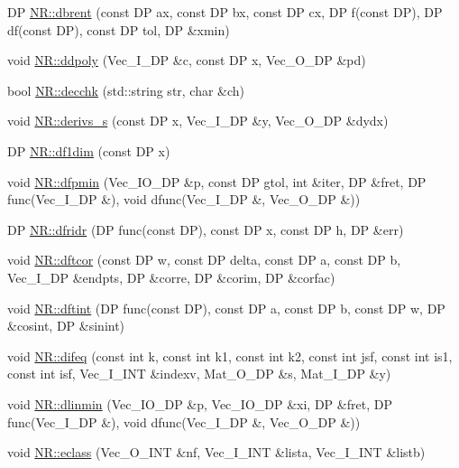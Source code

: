\begin{DoxyCompactItemize}
\item 
DP \mbox{\hyperlink{namespaceNR_af1d68c637282cf655b5c683b052a0b6d}{N\+R\+::dbrent}} (const DP ax, const DP bx, const DP cx, DP f(const DP), DP df(const DP), const DP tol, DP \&xmin)
\item 
void \mbox{\hyperlink{namespaceNR_ad41cff50a7498a881df8034897f4fb51}{N\+R\+::ddpoly}} (Vec\+\_\+\+I\+\_\+\+DP \&c, const DP x, Vec\+\_\+\+O\+\_\+\+DP \&pd)
\item 
bool \mbox{\hyperlink{namespaceNR_a8d6348025222a219a6ed25d9f2d2b3f4}{N\+R\+::decchk}} (std\+::string str, char \&ch)
\item 
void \mbox{\hyperlink{namespaceNR_a42dd648242c5c48df166bfb2b2125d80}{N\+R\+::derivs\+\_\+s}} (const DP x, Vec\+\_\+\+I\+\_\+\+DP \&y, Vec\+\_\+\+O\+\_\+\+DP \&dydx)
\item 
DP \mbox{\hyperlink{namespaceNR_a2df356ad46edbeee385843c4545f3963}{N\+R\+::df1dim}} (const DP x)
\item 
void \mbox{\hyperlink{namespaceNR_a1c51cf1eefec14e2597519a70b6158d6}{N\+R\+::dfpmin}} (Vec\+\_\+\+I\+O\+\_\+\+DP \&p, const DP gtol, int \&iter, DP \&fret, DP func(Vec\+\_\+\+I\+\_\+\+DP \&), void dfunc(Vec\+\_\+\+I\+\_\+\+DP \&, Vec\+\_\+\+O\+\_\+\+DP \&))
\item 
DP \mbox{\hyperlink{namespaceNR_a116c23af5766d8a201469f22f62f50dc}{N\+R\+::dfridr}} (DP func(const DP), const DP x, const DP h, DP \&err)
\item 
void \mbox{\hyperlink{namespaceNR_a1c902ada2900da8c449d3901707c075b}{N\+R\+::dftcor}} (const DP w, const DP delta, const DP a, const DP b, Vec\+\_\+\+I\+\_\+\+DP \&endpts, DP \&corre, DP \&corim, DP \&corfac)
\item 
void \mbox{\hyperlink{namespaceNR_ae09a210159f99a027ae6554b6a605e5b}{N\+R\+::dftint}} (DP func(const DP), const DP a, const DP b, const DP w, DP \&cosint, DP \&sinint)
\item 
void \mbox{\hyperlink{namespaceNR_a7bed161b003de9971b9d0220074c406e}{N\+R\+::difeq}} (const int k, const int k1, const int k2, const int jsf, const int is1, const int isf, Vec\+\_\+\+I\+\_\+\+I\+NT \&indexv, Mat\+\_\+\+O\+\_\+\+DP \&s, Mat\+\_\+\+I\+\_\+\+DP \&y)
\item 
void \mbox{\hyperlink{namespaceNR_adb5624ebdf74af474a3a644c2aa3d3e7}{N\+R\+::dlinmin}} (Vec\+\_\+\+I\+O\+\_\+\+DP \&p, Vec\+\_\+\+I\+O\+\_\+\+DP \&xi, DP \&fret, DP func(Vec\+\_\+\+I\+\_\+\+DP \&), void dfunc(Vec\+\_\+\+I\+\_\+\+DP \&, Vec\+\_\+\+O\+\_\+\+DP \&))
\item 
void \mbox{\hyperlink{namespaceNR_aba4c7b853200439cb13a271f6333b19f}{N\+R\+::eclass}} (Vec\+\_\+\+O\+\_\+\+I\+NT \&nf, Vec\+\_\+\+I\+\_\+\+I\+NT \&lista, Vec\+\_\+\+I\+\_\+\+I\+NT \&listb)

\end{DoxyCompactItemize}
